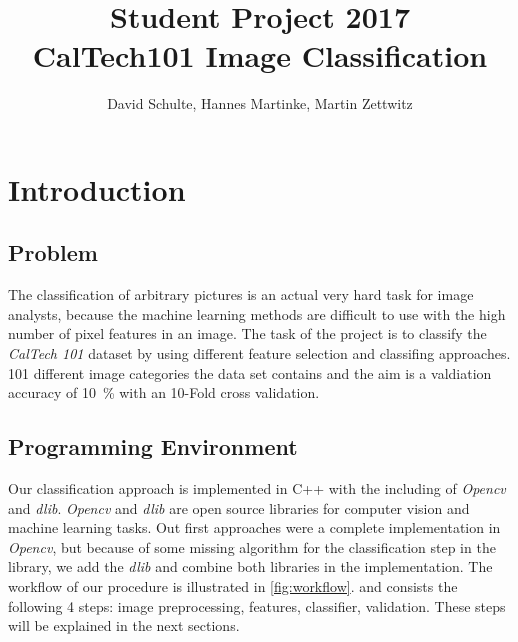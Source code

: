 \documentclass[a4paper,10pt]{article}
\title{ Student Project 2017 \\ CalTech101 Image Classification}
\author{David Schulte, Hannes Martinke, Martin Zettwitz}
\begin{document}
\maketitle

\section{Introduction}
\subsection{Problem}
The classification of arbitrary pictures is an actual very hard task for image analysts, because the machine learning methods are difficult to use with the high number of pixel features in an image.
The task of the project is to classify the \emph{CalTech 101} dataset by using different feature selection and classifing approaches. 
101 different image categories the data set contains and the aim is a valdiation accuracy of 10~\% with an 10-Fold cross validation.
\subsection{Programming Environment}
Our classification approach is implemented in C++ with the including of \emph{Opencv} and \emph{dlib}.
\emph{Opencv} and \emph{dlib} are open source libraries for computer vision and machine learning tasks. 
Out first approaches were a complete implementation in \emph{Opencv}, but because of some missing algorithm for the classification step in the library, we add the \emph{dlib} and combine both libraries in the implementation.
The workflow of our procedure is illustrated in \autoref{fig:workflow}. and consists the following 4 steps: image preprocessing, features, classifier, validation.
These steps will be explained in the next sections.
\end{document}
